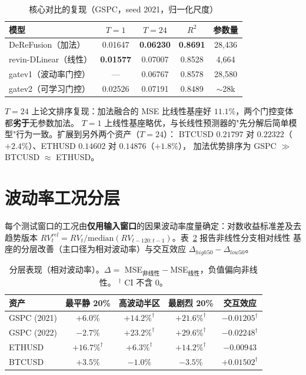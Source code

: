 \documentclass[conference]{IEEEtran}
\begin{document}
\begin{table}[!t]
\caption{核心对比的复现（GSPC，seed 2021，归一化尺度）}
\label{tab:repro}
\centering
\small
\begin{tabular}{@{}lcccc@{}}
\toprule
模型 & $T{=}1$ & $T{=}24$ & $R^2$ & 参数量 \\
\midrule
DeReFusion（加法）     & 0.01647 & \textbf{0.06230} & \textbf{0.8691} & 28{,}436 \\
revin-DLinear（线性）  & \textbf{0.01577} & 0.07007 & 0.8528 & 4{,}664 \\
gatev1（波动率门控）   & ---     & 0.06767 & 0.8578 & 28{,}580 \\
gatev2（可学习门控）   & 0.02526 & 0.07191 & 0.8489 & $\sim$28k \\
\bottomrule
\end{tabular}
\end{table}

$T=24$ 上论文排序复现：加法融合的 MSE 比线性基座好 $11.1\%$，两个门控变体都\textbf{劣于}无参数加法。
$T=1$ 上线性基座略优，与长线性预测器的"先分解后简单模型"行为一致。扩展到另外两个资产（$T=24$）：
BTCUSD $0.21797$ 对 $0.22322$（$+2.4\%$）、ETHUSD $0.14602$ 对 $0.14876$（$+1.8\%$），
加法优势排序为 GSPC $\gg$ BTCUSD $\approx$ ETHUSD。

\section{波动率工况分层}
每个测试窗口的工况由\textbf{仅用输入窗口}的因果波动率度量确定：对数收益标准差及去趋势版本
$RV^{rel}_t = RV_t / \mathrm{median}(RV_{t-120:t-1})$。表~\ref{tab:regime} 报告非线性分支相对线性
基座的分层改善（主口径为相对波动率）与交互效应 $\Delta_{high50}-\Delta_{low50}$。

\begin{table}[!t]
\caption{分层表现（相对波动率）。$\Delta=$ MSE$_{非线性}-$MSE$_{线性}$，负值偏向非线性。
$^\dagger$ CI 不含 0。}
\label{tab:regime}
\centering
\small
\begin{tabular}{@{}lcccc@{}}
\toprule
资产 & 最平静 20\% & 高波动半区 & 最剧烈 20\% & 交互效应 \\
\midrule
GSPC (2021) & $+6.0\%$ & $+14.2\%^\dagger$ & $+21.6\%^\dagger$ & $-0.01205^\dagger$ \\
GSPC (2022) & $-2.7\%$ & $+23.2\%^\dagger$ & $+29.6\%^\dagger$ & $-0.02248^\dagger$ \\
ETHUSD      & $+16.7\%^\dagger$ & $+6.3\%^\dagger$ & $+14.2\%^\dagger$ & $-0.00943$ \\
BTCUSD      & $+3.5\%$ & $-1.0\%$ & $-3.5\%$ & $+0.01502^\dagger$ \\
\bottomrule
\end{tabular}
\end{table}
\end{document}

